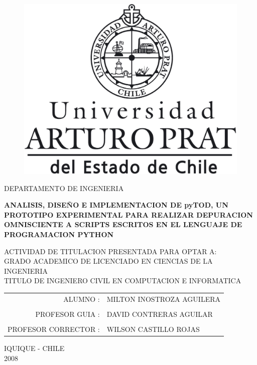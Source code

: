 \thispagestyle{empty}
\begin{singlespace}
\begin{figure}[hpb]
	\centering
	\includegraphics[scale=0.15]{images/logo.eps}
\end{figure}
\begin{center}

\vspace{-0.7cm}
DEPARTAMENTO DE INGENIERIA\\[4cm]

\begin{doublespace}
{\textbf{ANALISIS, DISEÑO E IMPLEMENTACION DE pyTOD, UN PROTOTIPO EXPERIMENTAL PARA REALIZAR DEPURACION OMNISCIENTE A SCRIPTS ESCRITOS EN EL LENGUAJE DE PROGRAMACION PYTHON}}\\[3cm]
\end{doublespace}
{\small ACTIVIDAD DE TITULACION PRESENTADA PARA OPTAR A:\\
GRADO ACADEMICO DE LICENCIADO EN CIENCIAS DE LA INGENIERIA\\
TITULO DE INGENIERO CIVIL EN COMPUTACION E INFORMATICA}\\[3cm]

\begin{table}[!h]
\begin{center}
\begin{tabular}{r l}
{\small ALUMNO :} & {\small MILTON INOSTROZA AGUILERA}\\
\\
{\small PROFESOR GUIA :} & {\small DAVID CONTRERAS AGUILAR}\\
\\
{\small PROFESOR CORRECTOR :} & {\small WILSON CASTILLO ROJAS}\\
\end{tabular}
\end{center}
\end{table}
\vspace{4cm}
IQUIQUE - CHILE\\
2008
\end{center}
\end{singlespace}